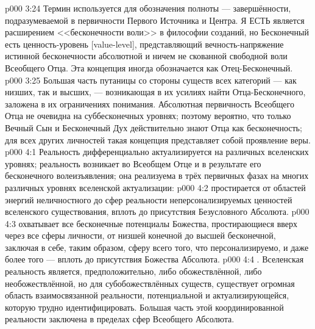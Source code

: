 \vs p000 3:24 \pc Термин  используется для обозначения полноты --- завершённости, подразумеваемой в первичности Первого Источника и Центра.  Я ЕСТЬ является расширением <<бесконечности воли>> в философии созданий, но Бесконечный есть  ценность\hyp{}уровень [value\hyp{}level], представляющий вечность\hyp{}напряжение истинной бесконечности абсолютной и ничем не скованной свободной воли Всеобщего Отца. Эта концепция иногда обозначается как Отец\hyp{}Бесконечный.
\vs p000 3:25 Большая часть путаницы со стороны существ всех категорий --- как низших, так и высших, --- возникающая в их усилиях найти Отца\hyp{}Бесконечного, заложена в их ограничениях понимания. Абсолютная первичность Всеобщего Отца не очевидна на суббесконечных уровнях; поэтому вероятно, что только Вечный Сын и Бесконечный Дух действительно знают Отца как бесконечность; для всех других личностей такая концепция представляет собой проявление веры.
\vs p000 4:1 Реальность дифференциально актуализируется на различных вселенских уровнях; реальность возникает во Всеобщем Отце и в результате его бесконечного волеизъявления; она реализуема в трёх первичных фазах на многих различных уровнях вселенской актуализации:
\vs p000 4:2 \bibnobreakspace {} простирается от областей энергий неличностного до сфер реальности неперсонализируемых ценностей вселенского существования, вплоть до присутствия Безусловного Абсолюта.
\vs p000 4:3 \bibnobreakspace {} охватывает все бесконечные потенциалы Божества, простирающиеся вверх через все сферы личности, от низшей конечной до высшей бесконечной, заключая в себе, таким образом, сферу всего того, что персонализируемо, и даже более того --- вплоть до присутствия Божества Абсолюта.
\vs p000 4:4 \bibnobreakspace {}. Вселенская реальность является, предположительно, либо обожествлённой, либо необожествлённой, но для субобожествлённых существ, существует огромная область взаимосвязанной реальности, потенциальной и актуализирующейся, которую трудно идентифицировать. Большая часть этой координированной реальности заключена в пределах сфер Всеобщего Абсолюта.

